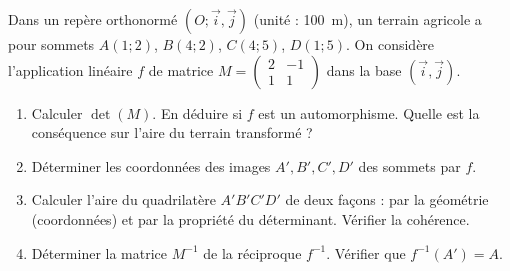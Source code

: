 \documentclass[11pt]{article}
\begin{document}
\begin{exercice}
Dans un repère orthonormé $(O; \vec{i}, \vec{j})$ (unité : \SI{100}{m}), un terrain agricole a pour sommets $A(1;2)$, $B(4;2)$, $C(4;5)$, $D(1;5)$. 
On considère l'application linéaire $f$ de matrice $M = \begin{pmatrix} 2 & -1 \\ 1 & 1 \end{pmatrix}$ dans la base $(\vec{i}, \vec{j})$.
\begin{enumerate}
    \item Calculer $\det(M)$. En déduire si $f$ est un automorphisme. Quelle est la conséquence sur l'aire du terrain transformé ?
    \item Déterminer les coordonnées des images $A', B', C', D'$ des sommets par $f$.
    \item Calculer l'aire du quadrilatère $A'B'C'D'$ de deux façons : par la géométrie (coordonnées) et par la propriété du déterminant. Vérifier la cohérence.
    \item Déterminer la matrice $M^{-1}$ de la réciproque $f^{-1}$. Vérifier que $f^{-1}(A') = A$.
\end{enumerate}
\end{exercice}
\end{document}
